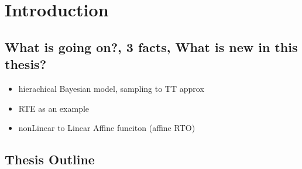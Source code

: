 \chapter{Introduction}

\section{What is going on?, 3 facts, What is new in this thesis?}
\begin{itemize}
	\item hierachical Bayesian model, sampling to TT approx
	\item RTE as an example
	\item nonLinear to Linear Affine funciton (affine RTO)
\end{itemize}

\section{Thesis Outline}

